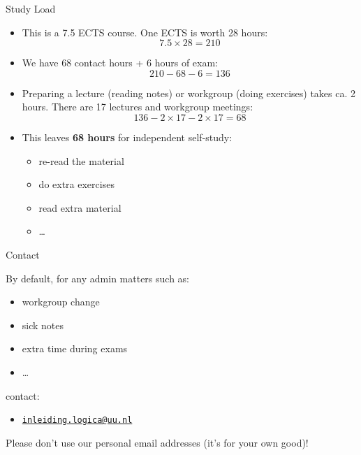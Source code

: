 \begin{frame}{Study Load}

	\begin{itemize}[<+->]

		\item This is a 7.5 ECTS course. One ECTS is worth 28 hours:
		\[7.5\times 28=210\]

		\item We have 68 contact hours + 6 hours of exam:
		\[210-68-6=136\]

		\item Preparing a lecture (reading notes) or workgroup (doing exercises) takes ca. 2 hours. There are 17 lectures and workgroup meetings:
		\[136-2\times 17-2\times 17=68\]

		\item This leaves \textbf{68 hours} for independent self-study:

			\begin{itemize}[<+->]

				\item re-read the material

				\item do extra exercises

				\item read extra material

				\item \dots

			\end{itemize}

	\end{itemize}

\end{frame}

\begin{frame}{Contact}

  By default, for any admin matters such as:
  \begin{itemize}[<+->]

	\item workgroup change
	\item sick notes
	\item extra time during exams
	\item  \dots
  \end{itemize}
  contact:
  \begin{itemize}
	\item \href{mailto:inleiding.logica@uu.nl}{\texttt{inleiding.logica@uu.nl}}
  \end{itemize}

  Please don't use our personal email addresses (it's for your own good)!

\end{frame}

